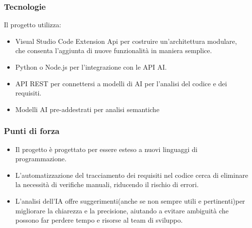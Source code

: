     \subsubsection{Tecnologie}
    Il progetto utilizza:

\begin{itemize}
    \item Visual Studio Code Extension Api per costruire un'architettura modulare, che consenta l'aggiunta di
nuove funzionalità in maniera semplice.
    \item Python o Node.js per l'integrazione con le API AI.
    \item API REST per connettersi a modelli di AI per l'analisi del codice e dei requisiti.
    \item Modelli AI pre-addestrati per analisi semantiche
\end{itemize}
    \subsubsection{Punti di forza}
   \begin{itemize}
    \item Il progetto è progettato per essere esteso a nuovi linguaggi di programmazione.
    \item L’automatizzazione del tracciamento dei requisiti nel codice cerca di eliminare la necessità di verifiche manuali, riducendo il rischio di errori.
    \item L’analisi dell’IA offre suggerimenti(anche se non sempre utili e pertinenti)per migliorare la chiarezza e la precisione, aiutando a evitare ambiguità che possono far perdere tempo e risorse al team di sviluppo.
\end{itemize}

